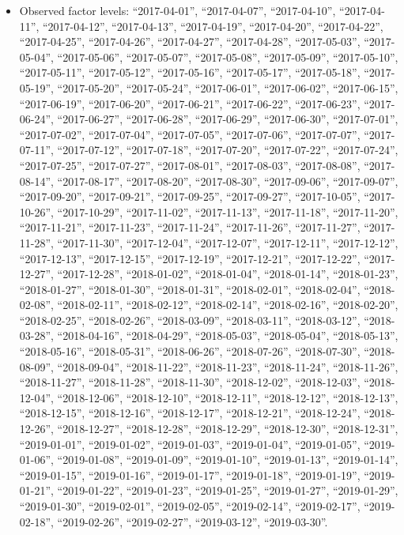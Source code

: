 \documentclass[
  letterpaper,
  DIV=11,
  numbers=noendperiod]{scrartcl}
\providecommand{\tightlist}{%
  \setlength{\itemsep}{0pt}\setlength{\parskip}{0pt}}
\begin{document}
\emini

\begin{itemize}
\tightlist
\item
  Observed factor levels: ``2017-04-01'', ``2017-04-07'',
  ``2017-04-10'', ``2017-04-11'', ``2017-04-12'', ``2017-04-13'',
  ``2017-04-19'', ``2017-04-20'', ``2017-04-22'', ``2017-04-25'',
  ``2017-04-26'', ``2017-04-27'', ``2017-04-28'', ``2017-05-03'',
  ``2017-05-04'', ``2017-05-06'', ``2017-05-07'', ``2017-05-08'',
  ``2017-05-09'', ``2017-05-10'', ``2017-05-11'', ``2017-05-12'',
  ``2017-05-16'', ``2017-05-17'', ``2017-05-18'', ``2017-05-19'',
  ``2017-05-20'', ``2017-05-24'', ``2017-06-01'', ``2017-06-02'',
  ``2017-06-15'', ``2017-06-19'', ``2017-06-20'', ``2017-06-21'',
  ``2017-06-22'', ``2017-06-23'', ``2017-06-24'', ``2017-06-27'',
  ``2017-06-28'', ``2017-06-29'', ``2017-06-30'', ``2017-07-01'',
  ``2017-07-02'', ``2017-07-04'', ``2017-07-05'', ``2017-07-06'',
  ``2017-07-07'', ``2017-07-11'', ``2017-07-12'', ``2017-07-18'',
  ``2017-07-20'', ``2017-07-22'', ``2017-07-24'', ``2017-07-25'',
  ``2017-07-27'', ``2017-08-01'', ``2017-08-03'', ``2017-08-08'',
  ``2017-08-14'', ``2017-08-17'', ``2017-08-20'', ``2017-08-30'',
  ``2017-09-06'', ``2017-09-07'', ``2017-09-20'', ``2017-09-21'',
  ``2017-09-25'', ``2017-09-27'', ``2017-10-05'', ``2017-10-26'',
  ``2017-10-29'', ``2017-11-02'', ``2017-11-13'', ``2017-11-18'',
  ``2017-11-20'', ``2017-11-21'', ``2017-11-23'', ``2017-11-24'',
  ``2017-11-26'', ``2017-11-27'', ``2017-11-28'', ``2017-11-30'',
  ``2017-12-04'', ``2017-12-07'', ``2017-12-11'', ``2017-12-12'',
  ``2017-12-13'', ``2017-12-15'', ``2017-12-19'', ``2017-12-21'',
  ``2017-12-22'', ``2017-12-27'', ``2017-12-28'', ``2018-01-02'',
  ``2018-01-04'', ``2018-01-14'', ``2018-01-23'', ``2018-01-27'',
  ``2018-01-30'', ``2018-01-31'', ``2018-02-01'', ``2018-02-04'',
  ``2018-02-08'', ``2018-02-11'', ``2018-02-12'', ``2018-02-14'',
  ``2018-02-16'', ``2018-02-20'', ``2018-02-25'', ``2018-02-26'',
  ``2018-03-09'', ``2018-03-11'', ``2018-03-12'', ``2018-03-28'',
  ``2018-04-16'', ``2018-04-29'', ``2018-05-03'', ``2018-05-04'',
  ``2018-05-13'', ``2018-05-16'', ``2018-05-31'', ``2018-06-26'',
  ``2018-07-26'', ``2018-07-30'', ``2018-08-09'', ``2018-09-04'',
  ``2018-11-22'', ``2018-11-23'', ``2018-11-24'', ``2018-11-26'',
  ``2018-11-27'', ``2018-11-28'', ``2018-11-30'', ``2018-12-02'',
  ``2018-12-03'', ``2018-12-04'', ``2018-12-06'', ``2018-12-10'',
  ``2018-12-11'', ``2018-12-12'', ``2018-12-13'', ``2018-12-15'',
  ``2018-12-16'', ``2018-12-17'', ``2018-12-21'', ``2018-12-24'',
  ``2018-12-26'', ``2018-12-27'', ``2018-12-28'', ``2018-12-29'',
  ``2018-12-30'', ``2018-12-31'', ``2019-01-01'', ``2019-01-02'',
  ``2019-01-03'', ``2019-01-04'', ``2019-01-05'', ``2019-01-06'',
  ``2019-01-08'', ``2019-01-09'', ``2019-01-10'', ``2019-01-13'',
  ``2019-01-14'', ``2019-01-15'', ``2019-01-16'', ``2019-01-17'',
  ``2019-01-18'', ``2019-01-19'', ``2019-01-21'', ``2019-01-22'',
  ``2019-01-23'', ``2019-01-25'', ``2019-01-27'', ``2019-01-29'',
  ``2019-01-30'', ``2019-02-01'', ``2019-02-05'', ``2019-02-14'',
  ``2019-02-17'', ``2019-02-18'', ``2019-02-26'', ``2019-02-27'',
  ``2019-03-12'', ``2019-03-30''.
\end{itemize}
\end{document}
